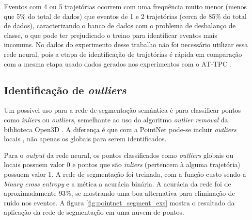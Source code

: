 \documentclass[a4paper,12pt,oneside]{book}
\begin{document}
\par Eventos com 4 ou 5 trajetórias ocorrem com uma frequência muito menor (menos que 5\% do total de dados) que eventos de 1 e 2 trajetórias (cerca de 85\% do total de dados), caracterizando o banco de dados com o problema de desbalanço de classe, o que pode ter prejudicado o treino para identificar eventos mais incomuns. No dados do experimento desse trabalho não foi necessário utilizar essa rede neural, pois a etapa de identificação de trajetórias é rápida em comparação com a mesma etapa usado dados gerados nos experimentos com o AT-TPC \cite{attpc, FORTINO2022166497}.

\subsection{Identificação de \textit{outliers}}

\par Um possível uso para a rede de segmentação semântica é para classificar pontos como \textit{inliers} ou \textit{outliers}, semelhante ao uso do algoritmo \textit{outlier removal} da biblioteca Open3D \cite{open3d}. A diferença é que com a PointNet pode-se incluir \textit{outliers} locais \cite{RF_pc}, não apenas os globais para serem identificados.

\par Para o \textit{output} da rede neural, os pontos classificados como \textit{outliers} globais ou locais possuem valor 0 e pontos que são \textit{inliers} (pertencem à alguma trajetória) possuem valor 1. A rede de segmentação foi treinada, com a função custo sendo a \textit{binary cross entropy} e a mética a acurácia binária. A acurácia da rede foi de aproximadamente 93\%, se mostrando uma boa alternativa para eliminação de ruído nos eventos. A figura \ref{fig:pointnet_segment_exs} mostra o resultado da aplicação da rede de segmentação em uma nuvem de pontos.
\end{document}

